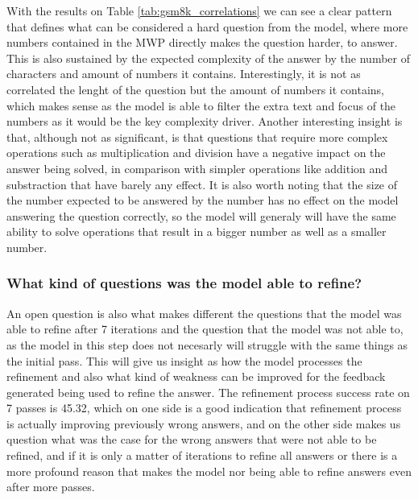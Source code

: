 \documentclass[a4paper,10pt]{article}
\begin{document}
With the results on Table \ref{tab:gsm8k_correlations} we can see a clear pattern that defines what can be considered a hard question from the model, where more numbers contained in the MWP directly makes the question harder, to answer. This is also sustained by the expected complexity of the answer by the number of characters and amount of numbers it contains. Interestingly, it is not as correlated the lenght of the question but the amount of numbers it contains, which makes sense as the model is able to filter the extra text and focus of the numbers as it would be the key complexity driver. Another interesting insight is that, although not as significant, is that questions that require more complex operations such as multiplication and division have a negative impact on the answer being solved, in comparison with simpler operations like addition and substraction that have barely any effect. It is also worth noting that the size of the number expected to be answered by the number has no effect on the model answering the question correctly, so the model will generaly will have the same ability to solve operations that result in a bigger number as well as a smaller number.

\subsubsection{What kind of questions was the model able to refine?}
An open question is also what makes different the questions that the model was able to refine after 7 iterations and the question that the model was not able to, as the model in this step does not necesarly will struggle with the same things as the initial pass. This will give us insight as how the model processes the refinement and also what kind of weakness can be improved for the feedback generated being used to refine the answer. The refinement process success rate on 7 passes is 45.32, which on one side is a good indication that refinement process is actually improving previously wrong answers, and on the other side makes us question what was the case for the wrong answers that were not able to be refined, and if it is only a matter of iterations to refine all answers or there is a more profound reason that makes the model nor being able to refine answers even after more passes.
\end{document}

